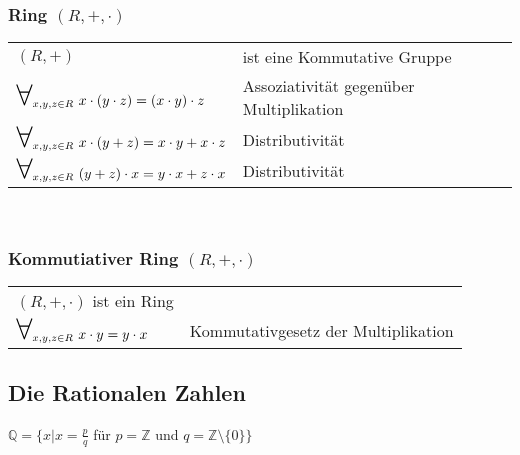 \documentclass[a4paper]{scrartcl}
\newcommand\bigforall{\mbox{\huge $\forall$}}
\begin{document}
\subsubsection{Ring $(R,+, \cdot)$}
\begin{tabular}{l l}
$(R,+)$ & ist eine Kommutative Gruppe \\
$\bigforall_{x,y,z \in R} \ x \cdot (y \cdot z) = (x \cdot y) \cdot z$ & Assoziativität gegenüber Multiplikation\\
$\bigforall_{x,y,z \in R} \ x \cdot (y + z) = x \cdot y + x \cdot z$ & Distributivität \\
$\bigforall_{x,y,z \in R} \ (y + z) \cdot x = y \cdot x + z \cdot x$ & Distributivität
\end{tabular} \\
\subsubsection{Kommutiativer Ring $(R,+, \cdot)$}
\begin{tabular}{l l}
$(R,+, \cdot)$ ist ein Ring \\
$\bigforall_{x,y,z \in R} \ x \cdot y = y \cdot x$ & Kommutativgesetz der Multiplikation 
\end{tabular}
\subsection{Die Rationalen Zahlen}

$\mathbb{Q} = \Big\{x | x = \frac{p}{q} $ für $p=\mathbb{Z}$ und $q=\mathbb{Z} \setminus \{0\} \Big\}$
\end{document}
